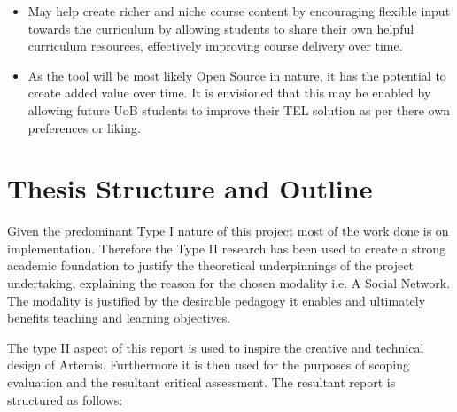 \begin{itemize}
    \item May help create richer and niche course content by encouraging flexible input towards the curriculum by allowing students to share their own helpful curriculum resources, effectively improving course delivery over time.
    
    \item As the tool will be most likely Open Source in nature, it has the potential to create added value over time. It is envisioned that this may be enabled by allowing future UoB students to improve their TEL solution as per there own preferences or liking.
    
\end{itemize}









\section{Thesis Structure and Outline}
\label{sec1:sec04}

Given the predominant Type I nature of this project most of the work done is on implementation. Therefore the Type II research has been used to create a strong academic foundation to justify the theoretical underpinnings of the project undertaking, explaining the reason for the chosen modality i.e. A Social Network. The modality is justified by the desirable pedagogy it enables and ultimately benefits teaching and learning objectives.

The type II aspect of this report is used to inspire the creative and technical design of Artemis. Furthermore it is then used for the purposes of scoping evaluation and the resultant critical assessment. The resultant report is structured as follows:

